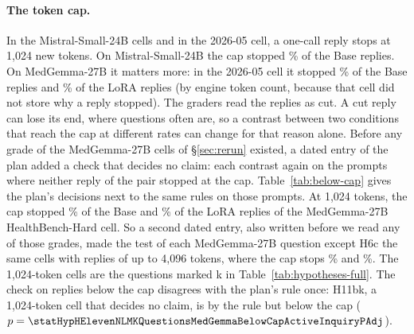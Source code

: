 \documentclass{article}
\newcommand{\hbhard}{HealthBench-Hard}
\begin{document}
\paragraph{The token cap.} In the Mistral-Small-24B cells and in the 2026-05 cell, a one-call
reply stops at 1,024 new tokens. On Mistral-Small-24B the cap stopped \statHBMistralAtLimitBasePct\% of the Base
replies. On MedGemma-27B it matters more: in the 2026-05 cell it stopped
\statHBMedGemmaMayAtLimitBasePct\% of the Base replies and \statHBMedGemmaMayAtLimitLoRAPct\% of the
LoRA replies (by engine token count, because that cell did not store why a reply stopped). The
graders read the replies as cut. A cut reply can lose its end, where questions often are, so a
contrast between two conditions that reach the cap at different rates can change for that reason
alone. Before any grade of the MedGemma-27B cells of \S\ref{sec:rerun} existed, a dated entry of
the plan added a check that decides no claim: each contrast again on the prompts where neither
reply of the pair stopped at the cap. Table~\ref{tab:below-cap} gives the plan's decisions next to
the same rules on those prompts. At 1,024 tokens, the cap stopped \statHBMedGemmaAtLimitBasePct\%
of the Base and \statHBMedGemmaAtLimitLoRAPct\% of the LoRA replies of the MedGemma-27B \hbhard{}
cell. So a second dated entry, also written before we read any of those grades, made the test of
each MedGemma-27B question except H6c the same cells with replies of up to 4,096 tokens, where the
cap stops
\statHBMedGemmaCapAtLimitBasePct\% and \statHBMedGemmaCapAtLimitLoRAPct\%. The 1,024-token cells
are the questions marked k in Table~\ref{tab:hypotheses-full}. The check on replies below the cap
disagrees with the plan's rule once: H11bk, a 1,024-token cell that decides no claim, is
\statHypHElevenNLMKQuestionsMedGemmaDecision{} by the rule but
\statHypHElevenNLMKQuestionsMedGemmaBelowCapDecision{} below the cap
($p = \statHypHElevenNLMKQuestionsMedGemmaBelowCapActiveInquiryPAdj$).

\begin{table}[!ht]
\centering
\caption{The plan's decisions next to the same rules on the prompts where both conditions of the
contrast have a reply and neither reply stopped at the token cap, for the questions that use the rules of H1, H2, H4 and
H6. The check decides no claim. $p$ is adjusted as in Table~\ref{tab:hypotheses-full}.}
\label{tab:below-cap}
\small
\setlength{\tabcolsep}{3pt}
\resizebox{\linewidth}{!}{}
\end{table}
\end{document}
